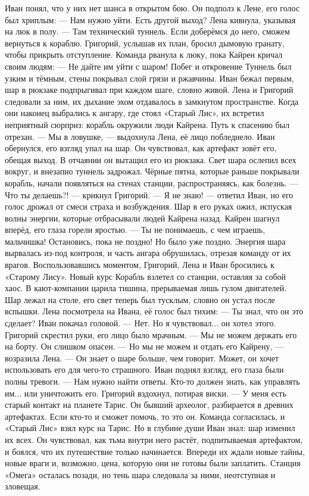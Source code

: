 \documentclass[12pt,a4paper]{book}
\begin{document}
Иван понял, что у них нет шанса в открытом бою. Он подполз к Лене, его голос был хриплым:
— Нам нужно уйти. Есть другой выход?  
Лена кивнула, указывая на люк в полу.
— Там технический туннель. Если доберёмся до него, сможем вернуться к кораблю.  
Григорий, услышав их план, бросил дымовую гранату, чтобы прикрыть отступление. Команда рванула к люку, пока Кайрен кричал своим людям:
— Не дайте им уйти с шаром!  
Побег и откровение
Туннель был узким и тёмным, стены покрывал слой грязи и ржавчины. Иван бежал первым, шар в рюкзаке подпрыгивал при каждом шаге, словно живой. Лена и Григорий следовали за ним, их дыхание эхом отдавалось в замкнутом пространстве.  
Когда они наконец выбрались к ангару, где стоял «Старый Лис», их встретил неприятный сюрприз: корабль окружили люди Кайрена. Путь к спасению был отрезан.  
— Мы в ловушке, — выдохнула Лена, её лицо побледнело.  
Иван обернулся, его взгляд упал на шар. Он чувствовал, как артефакт зовёт его, обещая выход. В отчаянии он вытащил его из рюкзака. Свет шара ослепил всех вокруг, и внезапно туннель задрожал. Чёрные пятна, которые раньше покрывали корабль, начали появляться на стенах станции, распространяясь, как болезнь.  
— Что ты делаешь?! — крикнул Григорий.  
— Я не знаю! — ответил Иван, но его голос дрожал от смеси страха и возбуждения. Шар в его руках ожил, испуская волны энергии, которые отбрасывали людей Кайрена назад.  
Кайрен шагнул вперёд, его глаза горели яростью.
— Ты не понимаешь, с чем играешь, мальчишка! Остановись, пока не поздно!  
Но было уже поздно. Энергия шара вырвалась из-под контроля, и часть ангара обрушилась, отрезая команду от их врагов. Воспользовавшись моментом, Григорий, Лена и Иван бросились к «Старому Лису».  
Новый курс
Корабль взлетел со станции, оставляя за собой хаос. В кают-компании царила тишина, прерываемая лишь гулом двигателей. Шар лежал на столе, его свет теперь был тусклым, словно он устал после вспышки.  
Лена посмотрела на Ивана, её голос был тихим:
— Ты знал, что он это сделает?  
Иван покачал головой.
— Нет. Но я чувствовал... он хотел этого.  
Григорий скрестил руки, его лицо было мрачным.
— Мы не можем держать его на борту. Он слишком опасен.  
— Но мы не можем и отдать его Кайрену, — возразила Лена. — Он знает о шаре больше, чем говорит. Может, он хочет использовать его для чего-то страшного.  
Иван поднял взгляд, его глаза были полны тревоги.
— Нам нужно найти ответы. Кто-то должен знать, как управлять им... или уничтожить его.  
Григорий вздохнул, потирая виски.
— У меня есть старый контакт на планете Тарис. Он бывший археолог, разбирается в древних артефактах. Если кто-то и сможет помочь, то это он.  
Команда согласилась, и «Старый Лис» взял курс на Тарис. Но в глубине души Иван знал: шар изменил их всех. Он чувствовал, как тьма внутри него растёт, подпитываемая артефактом, и боялся, что их путешествие только начинается.  
Впереди их ждали новые тайны, новые враги и, возможно, цена, которую они не готовы были заплатить. Станция «Омега» осталась позади, но тень шара следовала за ними, неотступная и зловещая.  
\end{document}
